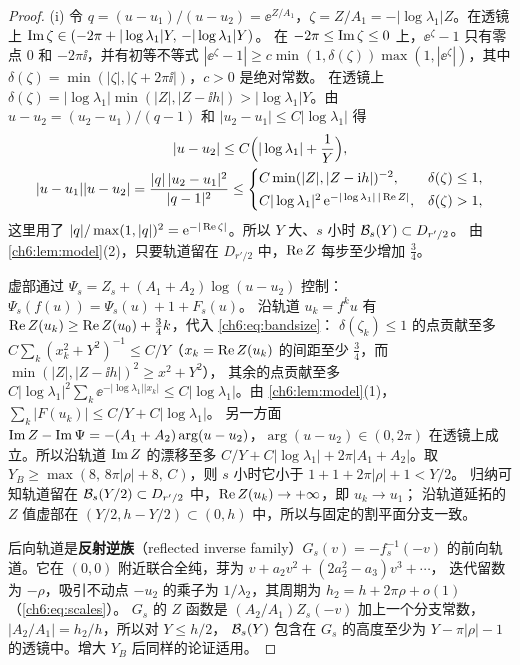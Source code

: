 \begin{proof}
(i) 令 $q=(u-u_1)/(u-u_2)=\ee^{Z/A_1}$，$\zeta=Z/A_1=-|\log\lambda_1|Z$。在透镜上 $\operatorname{Im}\zeta\in(-2\pi+|\log\lambda_1|Y,\,-|\log\lambda_1|Y)$。
在 $-2\pi\le\operatorname{Im}\zeta\le0$ 上，$\ee^\zeta-1$ 只有零点 $0$ 和 $-2\pi\ii$，并有初等不等式
$|\ee^\zeta-1|\ge c\min(1,\delta(\zeta))\max(1,|\ee^\zeta|)$，其中 $\delta(\zeta)=\min(|\zeta|,|\zeta+2\pi\ii|)$，$c>0$ 是绝对常数。
在透镜上 $\delta(\zeta)=|\log\lambda_1|\min(|Z|,|Z-\ii h|)>|\log\lambda_1|Y$。由 $u-u_2=(u_2-u_1)/(q-1)$ 和 $|u_2-u_1|\le C|\log\lambda_1|$ 得
\begin{gather}\label{ch6:eq:bandsize}
 |u-u_2|\le C\Bigl(|\log\lambda_1|+\frac1Y\Bigr),\\
 |u-u_1||u-u_2|=\frac{|q|\,|u_2-u_1|^2}{|q-1|^2}\le
 \begin{cases}C\min(|Z|,|Z-\mathrm{i} h|)^{-2},&\delta(\zeta)\le1,\\[2pt]
 C|\log\lambda_1|^2\,\mathrm{e}^{-|\log\lambda_1|\,|\operatorname{Re} Z|},&\delta(\zeta)>1,\end{cases}
\end{gather}
这里用了 $|q|/\max(1,|q|)^2=\mathrm{e}^{-|\operatorname{Re}\zeta|}$。所以 $Y$ 大、$s$ 小时 $\mathcal B_s(Y)\subset D_{r'/2}$。
由 \cref{ch6:lem:model}(2)，只要轨道留在 $D_{r'/2}$ 中，$\operatorname{Re} Z$ 每步至少增加 $\tfrac34$。

虚部通过 $\Psi_s=Z_s+(A_1+A_2)\log(u-u_2)$ 控制：$\Psi_s(f(u))=\Psi_s(u)+1+F_s(u)$。
沿轨道 $u_k=f^ku$ 有 $\operatorname{Re} Z(u_k)\ge\operatorname{Re} Z(u_0)+\tfrac34k$，代入 \eqref{ch6:eq:bandsize}：
$\delta(\zeta_k)\le1$ 的点贡献至多 $C\sum_k(x_k^2+Y^2)^{-1}\le C/Y$（$x_k=\operatorname{Re} Z(u_k)$ 的间距至少 $\tfrac34$，而 $\min(|Z|,|Z-\ii h|)^2\ge x^2+Y^2$），
其余的点贡献至多 $C|\log\lambda_1|^2\sum_k\ee^{-|\log\lambda_1||x_k|}\le C|\log\lambda_1|$。由 \cref{ch6:lem:model}(1)，$\sum_k|F(u_k)|\le C/Y+C|\log\lambda_1|$。
另一方面 $\operatorname{Im} Z-\operatorname{Im}\Psi=-(A_1+A_2)\arg(u-u_2)$，$\arg(u-u_2)\in(0,2\pi)$ 在透镜上成立。所以沿轨道 $\operatorname{Im} Z$ 的漂移至多
$C/Y+C|\log\lambda_1|+2\pi|A_1+A_2|$。取 $Y_B\ge\max(8,\,8\pi|\rho|+8,\,C)$，则 $s$ 小时它小于 $1+1+2\pi|\rho|+1<Y/2$。
归纳可知轨道留在 $\mathcal B_s(Y/2)\subset D_{r'/2}$ 中，$\operatorname{Re} Z(u_k)\to+\infty$，即 $u_k\to u_1$；
沿轨道延拓的 $Z$ 值虚部在 $(Y/2,h-Y/2)\subset(0,h)$ 中，所以与固定的割平面分支一致。

后向轨道是\textbf{反射逆族}（reflected inverse family）$G_s(v)=-f_s^{-1}(-v)$ 的前向轨道。它在 $(0,0)$ 附近联合全纯，芽为 $v+a_2v^2+(2a_2^2-a_3)v^3+\cdots$，
迭代留数为 $-\rho$，吸引不动点 $-u_2$ 的乘子为 $1/\lambda_2$，其周期为 $h_2=h+2\pi\rho+o(1)$（\eqref{ch6:eq:scales}）。
$G_s$ 的 $Z$ 函数是 $(A_2/A_1)Z_s(-v)$ 加上一个分支常数，$|A_2/A_1|=h_2/h$，所以对 $Y\le h/2$，
$\mathcal B_s(Y)$ 包含在 $G_s$ 的高度至少为 $Y-\pi|\rho|-1$ 的透镜中。增大 $Y_B$ 后同样的论证适用。


\end{proof}
